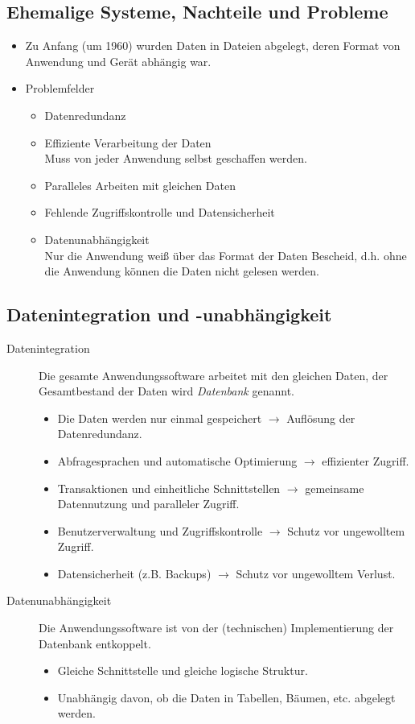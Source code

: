 		\subsection{Ehemalige Systeme, Nachteile und Probleme} %
			\begin{itemize}
				\item Zu Anfang (um 1960) wurden Daten in Dateien abgelegt, deren Format von Anwendung und Gerät abhängig war.
				\item Problemfelder
					\begin{itemize}
						\item Datenredundanz
						\item Effiziente Verarbeitung der Daten \\ Muss von jeder Anwendung selbst geschaffen werden.
						\item Paralleles Arbeiten mit gleichen Daten
						\item Fehlende Zugriffskontrolle und Datensicherheit
						\item Datenunabhängigkeit \\ Nur die Anwendung weiß über das Format der Daten Bescheid, d.h. ohne die Anwendung können die Daten nicht gelesen werden.
					\end{itemize}
			\end{itemize}

		\subsection{Datenintegration und -unabhängigkeit} %
			\begin{description}
				\item[Datenintegration] Die gesamte Anwendungssoftware arbeitet mit den gleichen Daten, der Gesamtbestand der Daten wird \textit{Datenbank} genannt.
					\begin{itemize}
						\item Die Daten werden nur einmal gespeichert \(\rightarrow\) Auflösung der Datenredundanz.
						\item Abfragesprachen und automatische Optimierung \(\rightarrow\) effizienter Zugriff.
						\item Transaktionen und einheitliche Schnittstellen \(\rightarrow\) gemeinsame Datennutzung und paralleler Zugriff.
						\item Benutzerverwaltung und Zugriffskontrolle \(\rightarrow\) Schutz vor ungewolltem Zugriff.
						\item Datensicherheit (z.B. Backups) \(\rightarrow\) Schutz vor ungewolltem Verlust.
					\end{itemize}
				\item[Datenunabhängigkeit] Die Anwendungssoftware ist von der (technischen) Implementierung der Datenbank entkoppelt.
					\begin{itemize}
						\item Gleiche Schnittstelle und gleiche logische Struktur.
						\item Unabhängig davon, ob die Daten in Tabellen, Bäumen, etc. abgelegt werden.
					\end{itemize}
			\end{description}


